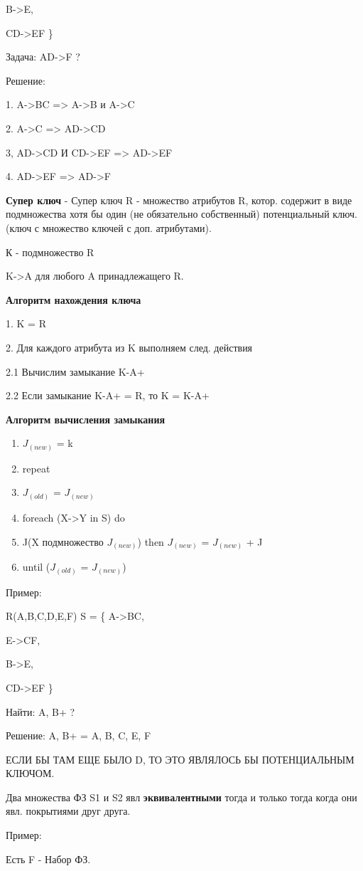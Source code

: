 B->E,

CD->EF
\}

Задача: AD->F ?

Решение:

1. A->BC => A->B и A->C

2. A->C => AD->CD

3, AD->CD И CD->EF => AD->EF

4. AD->EF => AD->F

\textbf{Супер ключ} - Супер ключ R - множество атрибутов R,
котор. содержит в виде подмножества хотя бы один
(не обязательно собственный) потенциальный ключ.
(ключ с множество ключей с доп. атрибутами).

К - подмножество R

K->A для любого A принадлежащего R.

\textbf{Алгоритм нахождения ключа}

1. K = R

2. Для каждого атрибута из K выполняем след. действия

2.1 Вычислим замыкание {K-A}+

2.2 Если замыкание {K-A}+ = R, то K = {K-A}+

\textbf{Алгоритм вычисления замыкания}

\begin{enumerate}
	\item $J_(new)$ = k
	\item repeat
	\item $J_(old)$ = $J_(new)$
	\item foreach (X->Y in S) do
	\item J(X подмножество $J_(new)$) then $J_(new)$ = $J_(new)$ + J
	\item until ($J_(old)$ = $J_(new)$)
\end{enumerate}

Пример:

R(A,B,C,D,E,F)
S = \{
A->BC,

E->CF,

B->E,

CD->EF
\}

Найти: {A, B}+ ?


Решение: {A, B}+ = {A, B, C, E, F}

ЕСЛИ БЫ ТАМ ЕЩЕ БЫЛО D, ТО ЭТО ЯВЛЯЛОСЬ БЫ ПОТЕНЦИАЛЬНЫМ КЛЮЧОМ.

Два множества ФЗ S1 и S2 явл \textbf{эквивалентными} тогда и только тогда
когда они явл. покрытиями друг друга.

Пример:

Есть F - Набор ФЗ.

